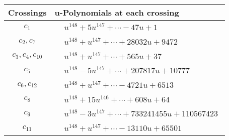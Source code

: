 \documentclass[1p]{elsarticle_modified}
\theoremstyle{definition}
\begin{document}
\begin{tabular}{m{50pt}|m{274pt}}
Crossings & \hspace{64pt}u-Polynomials at each crossing \\
\hline $$\begin{aligned}c_{1}\end{aligned}$$&$\begin{aligned}
&u^{148}+5 u^{147}+\cdots-47 u+1
\end{aligned}$\\
\hline $$\begin{aligned}c_{2},c_{7}\end{aligned}$$&$\begin{aligned}
&u^{148}+u^{147}+\cdots+28032 u+9472
\end{aligned}$\\
\hline $$\begin{aligned}c_{3},c_{4},c_{10}\end{aligned}$$&$\begin{aligned}
&u^{148}+u^{147}+\cdots+565 u+37
\end{aligned}$\\
\hline $$\begin{aligned}c_{5}\end{aligned}$$&$\begin{aligned}
&u^{148}-5 u^{147}+\cdots+207817 u+10777
\end{aligned}$\\
\hline $$\begin{aligned}c_{6},c_{12}\end{aligned}$$&$\begin{aligned}
&u^{148}+u^{147}+\cdots-4721 u+6513
\end{aligned}$\\
\hline $$\begin{aligned}c_{8}\end{aligned}$$&$\begin{aligned}
&u^{148}+15 u^{146}+\cdots+608 u+64
\end{aligned}$\\
\hline $$\begin{aligned}c_{9}\end{aligned}$$&$\begin{aligned}
&u^{148}-3 u^{147}+\cdots+733241455 u+110567423
\end{aligned}$\\
\hline $$\begin{aligned}c_{11}\end{aligned}$$&$\begin{aligned}
&u^{148}+u^{147}+\cdots-13110 u+65501
\end{aligned}$\\
\hline
\end{tabular}\\~\\
\end{document}
